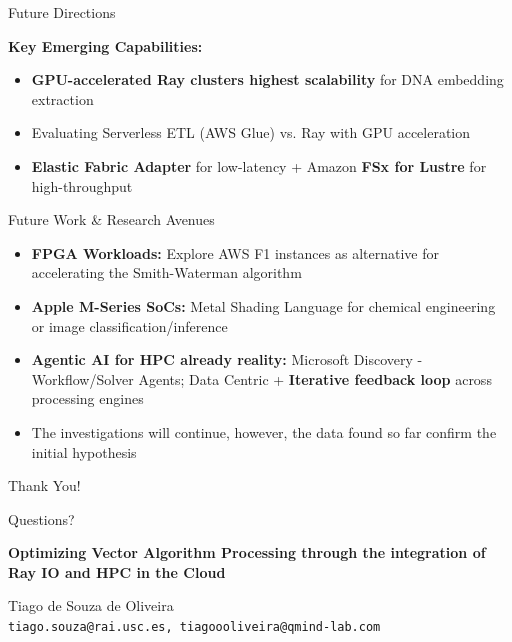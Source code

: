 \documentclass[aspectratio=169]{beamer}
\begin{document}
\begin{frame}{Future Directions}

            \textbf{Key Emerging Capabilities:}
            \begin{itemize}

                \item \textcolor{rayblue}{\textbf{GPU-accelerated Ray clusters highest scalability}} for DNA embedding extraction
                \item Evaluating Serverless ETL (AWS Glue) vs. Ray with GPU acceleration
                \item \textbf{Elastic Fabric Adapter} for low-latency + Amazon \textbf{FSx for Lustre} for high-throughput
            \end{itemize}

    
    \vspace{0.3cm}
    \begin{block}{Future Work \& Research Avenues}
        \begin{itemize}
            \item \textbf{FPGA Workloads:} Explore AWS F1 instances as alternative for accelerating the Smith-Waterman algorithm
            \item \textbf{Apple M-Series SoCs:} Metal Shading Language for chemical engineering or image classification/inference
            \item \textbf{Agentic AI for HPC already reality:} Microsoft Discovery - Workflow/Solver Agents; Data Centric + \textbf{Iterative feedback loop} across processing engines
            \item The investigations will continue, however, the data found so far confirm the initial hypothesis
        \end{itemize}
    \end{block}
\end{frame}


\begin{frame}[plain]
    \begin{center}
        \Huge Thank You!
        
        \vspace{1cm}
        \Large Questions?
        
        \vspace{0.8cm}
        \normalsize
        \textbf{Optimizing Vector Algorithm Processing through the integration of Ray IO and HPC in the Cloud}
        
        \vspace{0.5cm}
        Tiago de Souza de Oliveira \\
        \texttt{tiago.souza@rai.usc.es, tiagoooliveira@qmind-lab.com}
    \end{center}
\end{frame}
\end{document}
